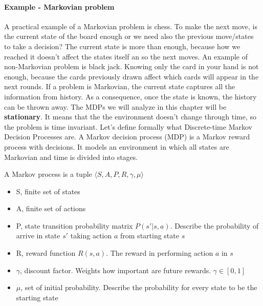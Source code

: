 \documentclass[main.tex]{subfiles}
\begin{document}
\paragraph{Example - Markovian problem} A practical example of a Markovian problem is chess. To make the next move, is the current state of the board enough or we need also the previous move/states to take a decision? The current state is more than enough, because how we reached it doesn't affect the states itself an so the next moves. An example of non-Markovian problem is black jack. Knowing only the card in your hand is not enough, because the cards previously drawn affect which cards will appear in the next rounds.
\newline
\newline
If a problem is Markovian, the current state captures all the information from history. As a consequence, once the state is known, the history can be thrown away. The MDPs we will analyze in this chapter will be \textbf{stationary}\footnotemark. It means that the the environment doesn't change through time, so the problem is time invariant.
\newline
Let's define formally what Discrete-time Markov Decision Processes are.
A Markov decision process (MDP) is a Markov reward process with decisions. It models an environment in which all states are Markovian and time is divided into stages.
\newpage
\begin{definition}
A Markov process is a tuple $\langle S, A, P, R, \gamma, \mu \rangle$
\begin{itemize}
    \item S, finite set of states
    \item A, finite set of actions
    \item P, state transition probability matrix $P(s'|s,a)$. Describe the probability of arrive in state $s'$ taking action $a$ from starting state $s$
    \item R, reward function $R(s,a)$. The reward in performing action $a$ in $s$ 
    \item $\gamma$, discount factor. Weights how important are future rewards. $\gamma \in [0,1]$
    \item $\mu$, set of initial probability. Describe the probability for every state to be the starting state
\end{itemize}
\end{definition}
\end{document}
